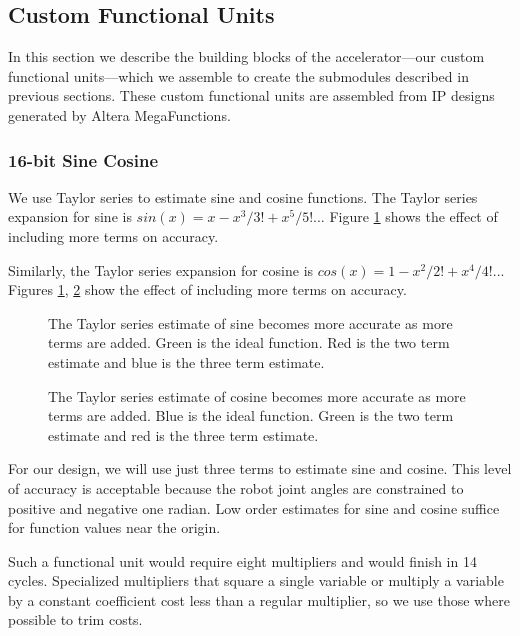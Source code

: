 \subsection{Custom Functional Units}
In this section we describe the building blocks of the accelerator---our custom functional units---which we assemble to create the submodules described in previous sections. These custom functional units are assembled from IP designs generated by Altera MegaFunctions.

\subsubsection{16-bit Sine Cosine}
We use Taylor series to estimate sine and cosine functions. The Taylor series expansion for sine is $sin(x) = x - x^3/3! + x^5/5!$... Figure \ref{fig:sine} shows the effect of including more terms on accuracy. 

Similarly, the Taylor series expansion for cosine is $cos(x) = 1 - x^2/2! + x^4/4!$... Figures  \ref{fig:sine}, \ref{fig:cosine} show the effect of including more terms on accuracy.

\begin{figure}[ht]
\center
{}
\caption{The Taylor series estimate of sine becomes more accurate as more terms are added. Green is the ideal function. Red is the two term estimate and blue is the three term estimate.}
\label{fig:sine}
\end{figure}

\begin{figure}[ht]
\center
{}
\caption{The Taylor series estimate of cosine becomes more accurate as more terms are added. Blue is the ideal function. Green is the two term estimate and red is the three term estimate.}
\label{fig:cosine}
\end{figure}

For our design, we will use just three terms to estimate sine and cosine. This level of accuracy is acceptable because the robot joint angles are constrained to positive and negative one radian. Low order estimates for sine and cosine suffice for function values near the origin.

Such a functional unit would require eight multipliers and would finish in 14 cycles. Specialized multipliers that square a single variable or multiply a variable by a constant coefficient cost less than a regular multiplier, so we use those where possible to trim costs.

